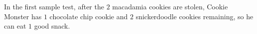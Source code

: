 In the first sample test, after the $2$ macadamia cookies are stolen, Cookie Monster has $1$ chocolate chip cookie and $2$ snickerdoodle cookies remaining, so he can eat $1$ good snack.
